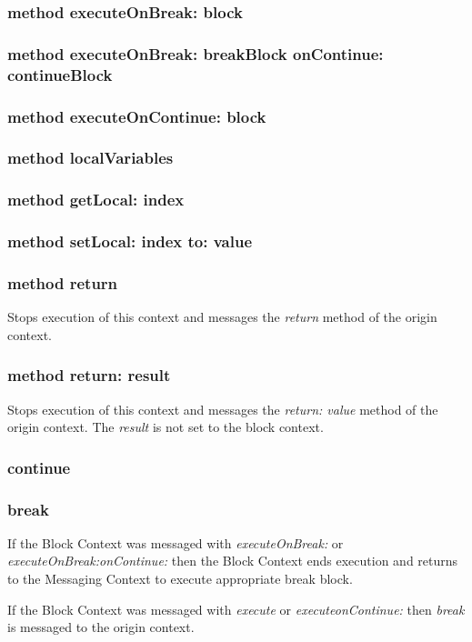 \subsubsection{method executeOnBreak: block}

\subsubsection{method executeOnBreak: breakBlock onContinue: continueBlock}

\subsubsection{method executeOnContinue: block}

\subsubsection{method localVariables}

\subsubsection{method getLocal: index}

\subsubsection{method setLocal: index to: value}

\subsubsection{method return}
Stops execution of this context and messages the \textit{return} method of the origin context.

\subsubsection{method return: result}
Stops execution of this context and messages the \textit{return: value} method of the origin context. The \textit{result} is not set to the block context.

\subsubsection{continue}

\subsubsection{break}
If the Block Context was messaged with \textit{executeOnBreak:} or \textit{executeOnBreak:onContinue:} then the Block Context ends execution and returns to the Messaging Context to execute appropriate break block.

If the Block Context was messaged with \textit{execute} or \textit{executeonContinue:} then \textit{break} is messaged to the origin context.
